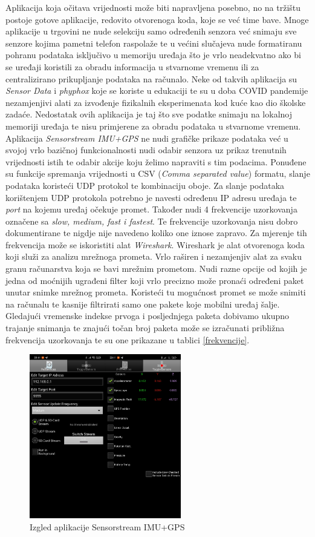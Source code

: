 \documentclass[times, utf8, diplomski]{fer}
\begin{document}
Aplikacija koja očitava vrijednosti može biti napravljena posebno, no na tržištu postoje gotove aplikacije, redovito otvorenoga koda, koje se već time bave.
Mnoge aplikacije u trgovini ne nude selekciju samo određenih senzora
već snimaju sve senzore kojima pametni telefon raspolaže te u većini slučajeva nude formatiranu
pohranu podataka isključivo u memoriju uređaja što je vrlo neadekvatno ako bi se uređaji
koristili za obradu informacija u stvarnome vremenu ili za centralizirano prikupljanje podataka na računalo. Neke od takvih aplikacija su
\textit{Sensor Data} i \textit{phyphox} koje se koriste u edukaciji te su u doba COVID pandemije
nezamjenjivi alati za izvođenje fizikalnih eksperimenata kod kuće kao dio
školske zadaće. Nedostatak ovih aplikacija je taj što sve podatke snimaju na lokalnoj memoriji uređaja te nisu primjerene za obradu podataka u stvarnome vremenu.
Aplikacija \textit{Sensorstream IMU+GPS} ne nudi grafičke prikaze podataka već u svojoj vrlo bazičnoj funkcionalnosti nudi odabir senzora uz prikaz trenutnih
vrijednosti istih te odabir akcije koju želimo napraviti s tim podacima. Ponuđene su funkcije spremanja vrijednosti u CSV (\textit{Comma separated value}) formatu,
slanje podataka koristeći UDP protokol te kombinaciju oboje. Za slanje podataka korištenjem UDP protokola potrebno je navesti određenu IP adresu uređaja te \textit{port} na
kojemu uređaj očekuje promet. Također nudi 4 frekvencije uzorkovanja označene sa \textit{slow, medium, fast i fastest}. Te frekvencije uzorkovanja nisu dobro dokumentirane
te nigdje nije navedeno koliko one iznose zapravo. Za mjerenje tih frekvencija može se iskoristiti alat \textit{Wireshark}. Wireshark je alat otvorenoga koda koji
služi za analizu mrežnoga prometa. Vrlo raširen i nezamjenjiv alat za svaku granu računarstva koja se bavi mrežnim prometom. Nudi razne opcije od kojih je jedna 
od moćnijih ugrađeni filter koji vrlo precizno može pronaći određeni paket unutar snimke mrežnog prometa. Koristeći tu mogućnost promet se može snimiti na računalu
te kasnije filtrirati samo one pakete koje mobilni uređaj šalje. Gledajući vremenske indekse prvoga i posljednjega paketa dobivamo ukupno trajanje
snimanja te znajući točan broj paketa može se izračunati približna frekvencija uzorkovanja te su one prikazane u tablici \ref{frekvencije}.

\begin{figure}
    \centering
    \includegraphics[width=250px]{app.jpg}
    \caption{Izgled aplikacije Sensorstream IMU+GPS}
\end{figure}
\end{document}
